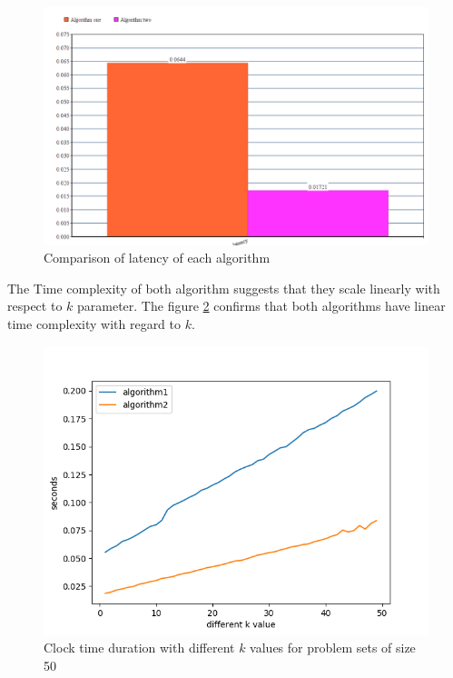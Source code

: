 \documentclass{template}
\begin{document}
\begin{figure}
    \includegraphics[width=\linewidth]{./images/latency_eval.png}
    \caption{Comparison of latency of each algorithm}
    \label{fig:latency_eval}
\end{figure}

The Time complexity of both algorithm suggests that they scale linearly with respect to \(k\) parameter.
The figure \ref{fig:k-comparison} confirms that both algorithms have linear time complexity with regard
to \(k\).

\begin{figure}
    \includegraphics[width=\linewidth]{./images/algo1_algo2_diff_k.png}
    \caption{Clock time duration with different \(k\) values for problem sets of size 50}
    \label{fig:k-comparison}
\end{figure} 
\end{document}

